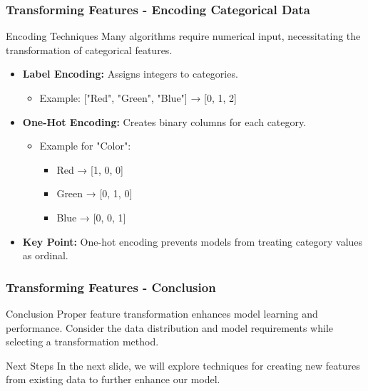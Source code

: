 \documentclass[aspectratio=169]{beamer}
\begin{document}
\begin{frame}[fragile]
    \frametitle{Transforming Features - Encoding Categorical Data}
    \begin{block}{Encoding Techniques}
        Many algorithms require numerical input, necessitating the transformation of categorical features.
        \begin{itemize}
            \item \textbf{Label Encoding:} Assigns integers to categories.
                \begin{itemize}
                    \item Example: ["Red", "Green", "Blue"] → [0, 1, 2]
                \end{itemize}
            \item \textbf{One-Hot Encoding:} Creates binary columns for each category.
                \begin{itemize}
                    \item Example for "Color":
                        \begin{itemize}
                            \item Red → [1, 0, 0]
                            \item Green → [0, 1, 0]
                            \item Blue → [0, 0, 1]
                        \end{itemize}
                \end{itemize}
            \item \textbf{Key Point:} 
                One-hot encoding prevents models from treating category values as ordinal.
        \end{itemize}
    \end{block}
\end{frame}

\begin{frame}[fragile]
    \frametitle{Transforming Features - Conclusion}
    \begin{block}{Conclusion}
        Proper feature transformation enhances model learning and performance. Consider the data distribution and model requirements while selecting a transformation method.
    \end{block}
    \begin{block}{Next Steps}
        In the next slide, we will explore techniques for creating new features from existing data to further enhance our model.
    \end{block}
\end{frame}
\end{document}

